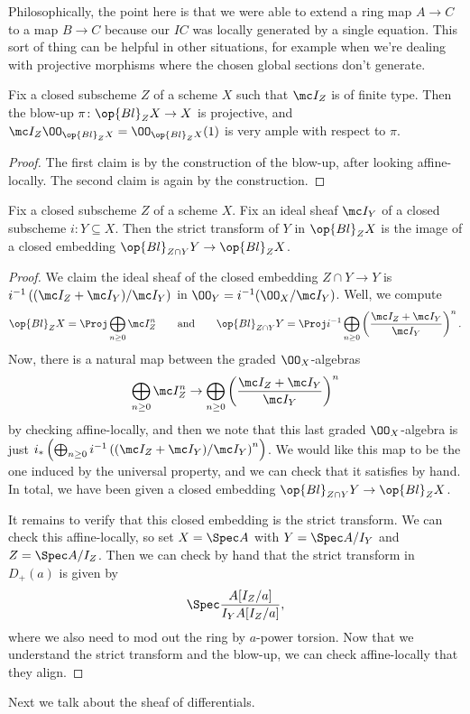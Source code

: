 \documentclass[../notes.tex]{subfiles}
\begin{document}
\begin{remark}
	Philosophically, the point here is that we were able to extend a ring map $A\to C$ to a map $B\to C$ because our $IC$ was locally generated by a single equation. This sort of thing can be helpful in other situations, for example when we're dealing with projective morphisms where the chosen global sections don't generate.
\end{remark}
\begin{cor}
	Fix a closed subscheme $Z$ of a scheme $X$ such that $\mc I_Z$ is of finite type. Then the blow-up $\pi\colon\op{Bl}_ZX\to X$ is projective, and $\mc I_Z\OO_{\op{Bl}_ZX}=\OO_{\op{Bl}_ZX}(1)$ is very ample with respect to $\pi$.
\end{cor}
\begin{proof}
	The first claim is by the construction of the blow-up, after looking affine-locally. The second claim is again by the construction.
\end{proof}
\begin{corollary}
	Fix a closed subscheme $Z$ of a scheme $X$. Fix an ideal sheaf $\mc I_Y$ of a closed subscheme $i\colon Y\subseteq X$. Then the strict transform of $Y$ in $\op{Bl}_ZX$ is the image of a closed embedding $\op{Bl}_{Z\cap Y}Y\to\op{Bl}_ZX$.
\end{corollary}
\begin{proof}
	We claim the ideal sheaf of the closed embedding $Z\cap Y\to Y$ is $i^{-1}\left((\mc I_Z+\mc I_Y)/\mc I_Y\right)$ in $\OO_Y=i^{-1}(\OO_X/\mc I_Y)$. Well, we compute
	\[\op{Bl}_ZX=\Proj\bigoplus_{n\ge0}\mc I_Z^n\qquad\text{and}\qquad\op{Bl}_{Z\cap Y}Y=\Proj i^{-1}\bigoplus_{n\ge0}\left(\frac{\mc I_Z+\mc I_Y}{\mc I_Y}\right)^n.\]
	Now, there is a natural map between the graded $\OO_X$-algebras
	\[\bigoplus_{n\ge0}\mc I_Z^n\to\bigoplus_{n\ge0}\left(\frac{\mc I_Z+\mc I_Y}{\mc I_Y}\right)^n\]
	by checking affine-locally, and then we note that this last graded $\OO_X$-algebra is just $i_*\left(\bigoplus_{n\ge0}i^{-1}\left((\mc I_Z+\mc I_Y)/\mc I_Y\right)^n\right)$. We would like this map to be the one induced by the universal property, and we can check that it satisfies by hand. In total, we have been given a closed embedding $\op{Bl}_{Z\cap Y}Y\to\op{Bl}_ZX$.

	It remains to verify that this closed embedding is the strict transform. We can check this affine-locally, so set $X=\Spec A$ with $Y=\Spec A/I_Y$ and $Z=\Spec A/I_Z$. Then we can check by hand that the strict transform in $D_+(a)$ is given by
	\[\Spec\frac{A[I_Z/a]}{I_YA[I_Z/a]},\]
	where we also need to mod out the ring by $a$-power torsion. Now that we understand the strict transform and the blow-up, we can check affine-locally that they align.
\end{proof}
Next we talk about the sheaf of differentials.
\end{document}
